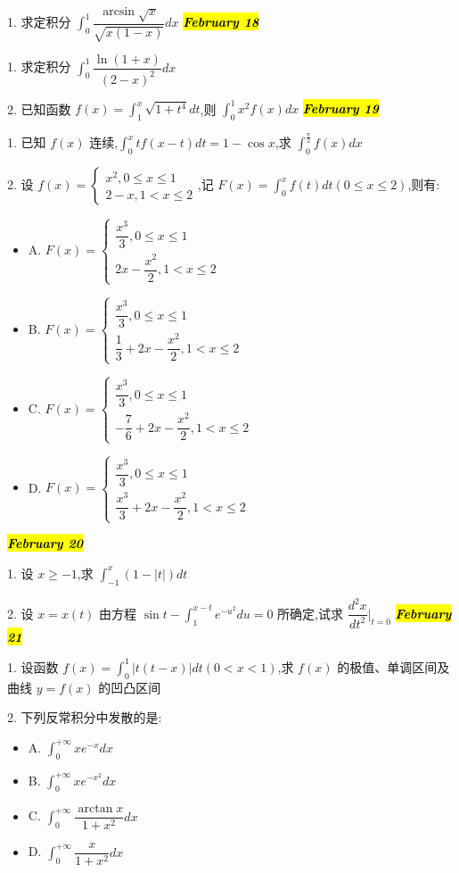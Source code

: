 1. 求定积分 $\int_{0}^{1}\dfrac{\arcsin \sqrt{x}}{\sqrt{x(1-x)}}dx$
\hl{\textbf{\textit{February 18}}}

1. 求定积分 $\int_{0}^{1}\dfrac{\ln(1+x)}{(2-x)^{2}}dx$

2. 已知函数 $f(x)=\int_{1}^{x}\sqrt{1+t^{4}}dt$,则 $\int_{0}^{1}x^{2}f(x)dx$
\hl{\textbf{\textit{February 19}}}

1. 已知 $f(x)$ 连续,$\int_{0}^{x}tf(x-t)dt=1-\cos x$,求 $\int_{0}^{\frac{\pi}{2}}f(x)dx$

2. 设 $f(x)=\begin{cases}
	x^{2},0\leq x\leq 1\\2-x, 1<x\leq 2 
\end{cases}$,记 $F(x)=\int_{0}^{x}f(t)dt(0\leq x\leq 2)$,则有:
\begin{itemize}
	\item A. $F(x)=\begin{cases}
		\dfrac{x^{3}}{3},0\leq x\leq 1\\
		2x-\dfrac{x^{2}}{2}, 1<x\leq 2
	\end{cases}$
	\item B. $F(x)=\begin{cases}
		\dfrac{x^{3}}{3},0\leq x\leq 1\\
		\dfrac{1}{3}+2x-\dfrac{x^{2}}{2}, 1<x\leq 2
	\end{cases}$
	\item C. $F(x)=\begin{cases}
		\dfrac{x^{3}}{3},0\leq x\leq 1\\
		-\dfrac{7}{6}+2x-\dfrac{x^{2}}{2}, 1<x\leq 2
	\end{cases}$
	\item D. $F(x)=\begin{cases}
		\dfrac{x^{3}}{3},0\leq x\leq 1\\
		\dfrac{x^{3}}{3}+2x-\dfrac{x^{2}}{2}, 1<x\leq 2
	\end{cases}$
\end{itemize}
\hl{\textbf{\textit{February 20}}}

1. 设 $x\geq -1$,求 $\int_{-1}^{x}(1-|t|)dt$

2. 设 $x=x(t)$ 由方程 $\sin t-\int_{1}^{x-t}e^{-u^{2}}du=0$ 所确定,试求 $\dfrac{d^{2}x}{dt^{2}}|_{t=0}$
\hl{\textbf{\textit{February 21}}}

1. 设函数 $f(x)=\int_{0}^{1}|t(t-x)|dt(0<x<1)$,求 $f(x)$ 的极值、单调区间及曲线 $y=f(x)$ 的凹凸区间

2. 下列反常积分中发散的是:
\begin{itemize}
	\item A. $\int_{0}^{+\infty}xe^{-x}dx$
	\item B. $\int_{0}^{+\infty}xe^{-x^{2}}dx$
	\item C. $\int_{0}^{+\infty}\dfrac{\arctan x}{1+x^{2}}dx$
	\item D. $\int_{0}^{+\infty}\dfrac{x}{1+x^{2}}dx$
\end{itemize}
